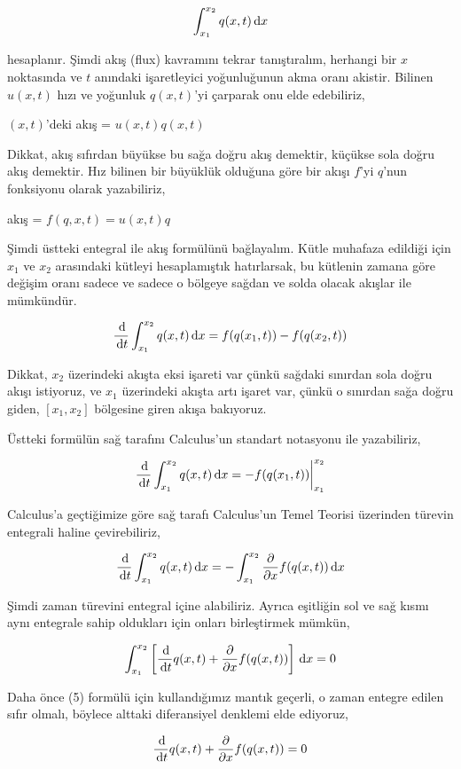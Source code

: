 \documentclass[12pt,fleqn]{article}\usepackage{../../common}
\begin{document}
$$
\int_{x_1}^{x_2} q(x,t) \,\mathrm{d} x
$$

hesaplanır. Şimdi akış (flux) kavramını tekrar tanıştıralım, herhangi bir $x$
noktasında ve $t$ anındaki işaretleyici yoğunluğunun akma oranı akistir.
Bilinen $u(x,t)$ hızı ve yoğunluk $q(x,t)$'yi çarparak onu elde edebiliriz,

$(x,t)$'deki akış  = $u(x,t) q(x,t)$

Dikkat, akış sıfırdan büyükse bu sağa doğru akış demektir, küçükse sola doğru
akış demektir. Hız bilinen bir büyüklük olduğuna göre bir akışı $f$'yi $q$'nun
fonksiyonu olarak yazabiliriz,

akış = $f(q,x,t) = u(x,t) q$ 

Şimdi üstteki entegral ile akış formülünü bağlayalım. Kütle muhafaza edildiği
için $x_1$ ve $x_2$ arasındaki kütleyi hesaplamıştık hatırlarsak, bu kütlenin
zamana göre değişim oranı sadece ve sadece o bölgeye sağdan ve solda olacak
akışlar ile mümkündür.

$$
\frac{\,\mathrm{d}}{\,\mathrm{d} t} \int_{x_1}^{x_2} q(x,t) \,\mathrm{d} x =
f(q(x_1,t)) - f(q(x_2,t)) 
$$

Dikkat, $x_2$ üzerindeki akışta eksi işareti var çünkü sağdaki sınırdan
sola doğru akışı istiyoruz, ve $x_1$ üzerindeki akışta artı işaret var,
çünkü o sınırdan sağa doğru giden, $[x_1,x_2]$ bölgesine giren akışa
bakıyoruz.

Üstteki formülün sağ tarafını Calculus'un standart notasyonu ile yazabiliriz,

$$
\frac{\,\mathrm{d}}{\,\mathrm{d} t} \int_{x_1}^{x_2} q(x,t) \,\mathrm{d} x =
-f(q(x_1,t)) \biggr\rvert_{x_1}^{x_2}
$$

Calculus'a geçtiğimize göre sağ tarafı Calculus'un Temel Teorisi üzerinden
türevin entegrali haline çevirebiliriz,

$$
\frac{\,\mathrm{d}}{\,\mathrm{d} t} \int_{x_1}^{x_2} q(x,t) \,\mathrm{d} x =
- \int_{x_1}^{x_2} \frac{\partial }{\partial x} f(q(x,t)) \,\mathrm{d} x
$$

Şimdi zaman türevini entegral içine alabiliriz. Ayrıca eşitliğin sol ve sağ
kısmı aynı entegrale sahip oldukları için onları birleştirmek mümkün,

$$
\int_{x_1}^{x_2}
\left[
\frac{\,\mathrm{d}}{\,\mathrm{d} t} q(x,t) + \frac{\partial }{\partial x} f(q(x,t)) 
\right]
\,\mathrm{d} x  = 0
$$

Daha önce (5) formülü için kullandığımız mantık geçerli, o zaman entegre
edilen sıfır olmalı, böylece alttaki diferansiyel denklemi elde ediyoruz,

$$
\frac{\,\mathrm{d}}{\,\mathrm{d} t} q(x,t) + \frac{\partial }{\partial x} f(q(x,t))  = 0
$$
\end{document}
